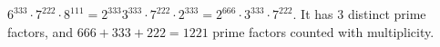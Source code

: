 $6^{333}\cdot7^{222}\cdot8^{111}=2^{333}3^{333}\cdot7^{222}\cdot2^{333}=2^{666}\cdot3^{333}\cdot7^{222}$. It has $\boxed{3}$ distinct prime factors, and $666+333+222=\boxed{1221}$ prime factors counted with multiplicity.
